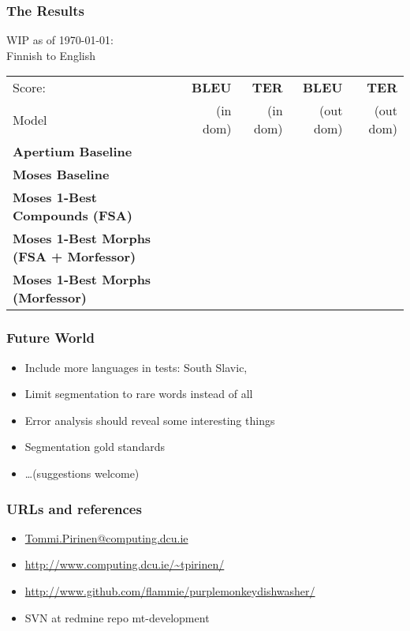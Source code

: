 \documentclass{beamer}
\begin{document}
\begin{frame}
    \frametitle{The Results}
    \begin{tiny}
    WIP as of \today: \\
    Finnish to English\\
        \begin{tabular}{|l|r|r||r|r|}
            \hline
            Score: & \bf BLEU & \bf TER  & \bf BLEU  & \bf TER   \\
            Model  & (in dom) & (in dom) & (out dom) & (out dom) \\ 
            \hline
            \bf Apertium Baseline      & & & &  \\
            \hline
            \bf Moses Baseline         & & & &  \\
            \hline
            \bf Moses 1-Best Compounds (FSA) & & & &  \\
            \hline
            \bf Moses 1-Best Morphs (FSA + Morfessor) & & & & \\
            \hline
            \bf Moses 1-Best Morphs (Morfessor) & & & &  \\
            \hline
        \end{tabular}
    \end{tiny}
\end{frame}
\begin{frame}
    \frametitle{Future World}
    \begin{itemize}
        \item Include more languages in tests: South Slavic, 
        \item Limit segmentation to rare words instead of all
        \item Error analysis should reveal some interesting things
        \item Segmentation gold standards
        \item \ldots (suggestions welcome)
    \end{itemize}
\end{frame}

\begin{frame}
    \frametitle{URLs and references}
    \begin{itemize}
        \item \url{Tommi.Pirinen@computing.dcu.ie}
        \item \url{http://www.computing.dcu.ie/~tpirinen/} 
        \item \url{http://www.github.com/flammie/purplemonkeydishwasher/}
        \item SVN at redmine repo mt-development
    \end{itemize}
\end{frame}


\end{document}
